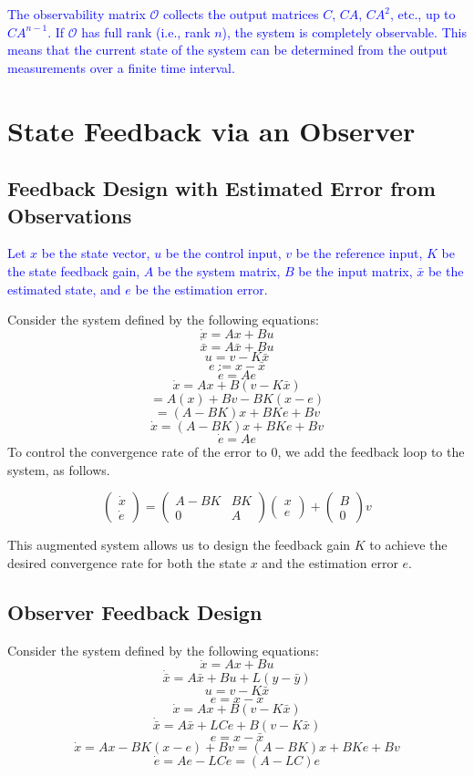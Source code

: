 \documentclass{article}
\begin{document}
\textcolor{blue}{The observability matrix \( \mathcal{O} \) collects the output matrices \( C \), \( CA \), \( CA^2 \), etc., up to \( CA^{n-1} \). If \( \mathcal{O} \) has full rank (i.e., rank \( n \)), the system is completely observable. This means that the current state of the system can be determined from the output measurements over a finite time interval.}

\section{State Feedback via an Observer}
\subsection{Feedback Design with Estimated Error from Observations}

\textcolor{blue}{Let $x$ be the state vector, $u$ be the control input, $v$ be the reference input, $K$ be the state feedback gain, $A$ be the system matrix, $B$ be the input matrix, $\bar{x}$ be the estimated state, and $e$ be the estimation error.}

Consider the system defined by the following equations:
\[
\dot{x} = Ax + Bu
\]
\[
\dot{\bar{x}} = A\bar{x} + Bu
\]
\[
u = v - K\bar{x}
\]
\[
e := x - \bar{x}
\]
\[
\dot{e} = Ae
\]
\[
\dot{x} = Ax + B(v - K\bar{x})
\]
\[
= A(x) + Bv - BK(x - e)
\]
\[
= (A - BK)x + BKe + Bv
\]
\[
\dot{x} = (A - BK)x + BKe + Bv
\]
\[
\dot{e} = Ae
\]
To control the convergence rate of the error to 0, we add the feedback loop to the system, as follows.

\[
\begin{pmatrix}
\dot{x} \\
\dot{e}
\end{pmatrix}
=
\begin{pmatrix}
A - BK & BK \\
0 & A
\end{pmatrix}
\begin{pmatrix}
x \\
e
\end{pmatrix}
+
\begin{pmatrix}
B \\
0
\end{pmatrix}
v
\]

This augmented system allows us to design the feedback gain $K$ to achieve the desired convergence rate for both the state $x$ and the estimation error $e$.

\subsection{Observer Feedback Design}
Consider the system defined by the following equations:
\[
\dot{x} = Ax + Bu
\]
\[
\dot{\bar{x}} = A\bar{x} + Bu + L(y - \bar{y})
\]
\[
u = v - K\bar{x}
\]
\[
e = x - \bar{x}
\]
\[
\dot{x} = Ax + B(v - K\bar{x})
\]
\[
\dot{\bar{x}} = A\bar{x} + LCe + B(v - K\bar{x})
\]
\[
e = x - \bar{x}
\]
\[
\dot{x} = Ax - BK(x - e) + Bv = (A - BK)x + BKe + Bv
\]
\[
\dot{e} = Ae - LCe = (A - LC)e
\]
\end{document}
